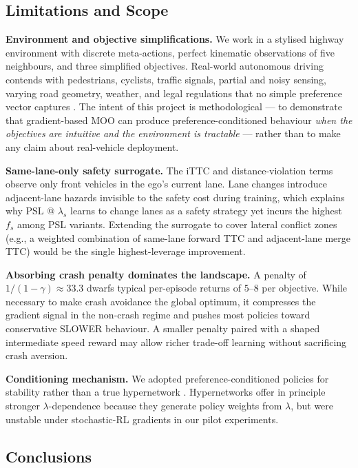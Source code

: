 \documentclass[12pt, letterpaper]{article}
\begin{document}
\subsection{Limitations and Scope}

\textbf{Environment and objective simplifications.}
We work in a stylised highway environment with discrete meta-actions, perfect kinematic observations of five neighbours, and three simplified objectives.
Real-world autonomous driving contends with pedestrians, cyclists, traffic signals, partial and noisy sensing, varying road geometry, weather, and legal regulations that no simple preference vector captures \cite{kiran2021deep,hayes2022practical}.
The intent of this project is methodological --- to demonstrate that gradient-based MOO can produce preference-conditioned behaviour \emph{when the objectives are intuitive and the environment is tractable} --- rather than to make any claim about real-vehicle deployment.

\textbf{Same-lane-only safety surrogate.}
The iTTC and distance-violation terms observe only front vehicles in the ego's current lane.
Lane changes introduce adjacent-lane hazards invisible to the safety cost during training, which explains why PSL @ $\lambda_s$ learns to change lanes as a safety strategy yet incurs the highest $f_s$ among PSL variants.
Extending the surrogate to cover lateral conflict zones (e.g., a weighted combination of same-lane forward TTC and adjacent-lane merge TTC) would be the single highest-leverage improvement.

\textbf{Absorbing crash penalty dominates the landscape.}
A penalty of $1/(1-\gamma)\approx 33.3$ dwarfs typical per-episode returns of $5$--$8$ per objective.
While necessary to make crash avoidance the global optimum, it compresses the gradient signal in the non-crash regime and pushes most policies toward conservative SLOWER behaviour.
A smaller penalty paired with a shaped intermediate speed reward may allow richer trade-off learning without sacrificing crash aversion.

\textbf{Conditioning mechanism.}
We adopted preference-conditioned policies for stability rather than a true hypernetwork \cite{navon2020learning,liu2025pareto}.
Hypernetworks offer in principle stronger $\lambda$-dependence because they generate policy weights from $\lambda$, but were unstable under stochastic-RL gradients in our pilot experiments.

\subsection{Conclusions}
\end{document}
